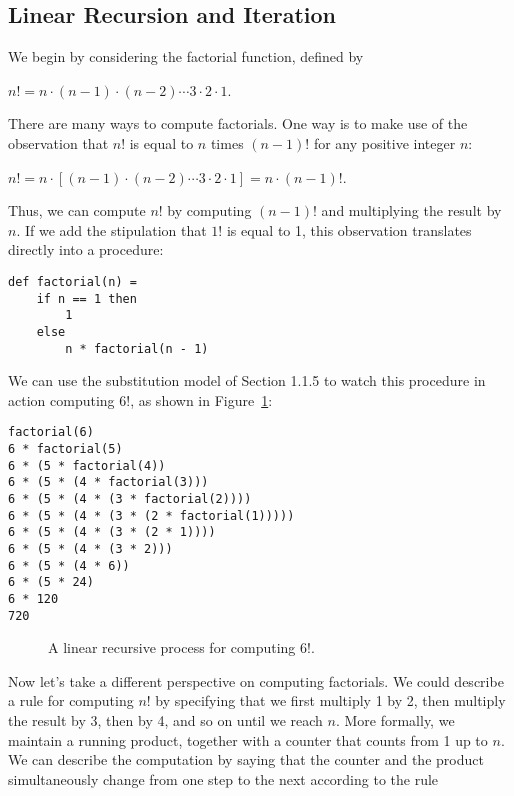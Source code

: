\subsection{Linear Recursion and Iteration}

We begin by considering the factorial function, defined by

$n! = n \cdot (n - 1) \cdot (n - 2) \cdots 3 \cdot 2 \cdot 1$.

There are many ways to compute factorials. One way is to make use of the observation that $n!$ is equal to $n$ times $(n - 1)!$ for any positive integer $n$:

$n! = n \cdot [(n - 1) \cdot (n - 2) \cdots 3 \cdot 2 \cdot 1] = n \cdot (n - 1)!$.

Thus, we can compute $n!$ by computing $(n - 1)!$ and multiplying the result by $n$. If we add the stipulation that $1!$ is equal to 1, this observation translates directly into a procedure:

\begin{lstlisting}
def factorial(n) =
    if n == 1 then
        1
    else
        n * factorial(n - 1)
\end{lstlisting}

We can use the substitution model of Section 1.1.5 to watch this procedure in action computing $6!$, as shown in Figure~\ref{fig:linear-recursive-factorial}:

\begin{verbatim}
factorial(6)
6 * factorial(5)
6 * (5 * factorial(4))
6 * (5 * (4 * factorial(3)))
6 * (5 * (4 * (3 * factorial(2))))
6 * (5 * (4 * (3 * (2 * factorial(1)))))
6 * (5 * (4 * (3 * (2 * 1))))
6 * (5 * (4 * (3 * 2)))
6 * (5 * (4 * 6))
6 * (5 * 24)
6 * 120
720
\end{verbatim}

\begin{figure}[h]
\centering
\caption{A linear recursive process for computing $6!$.}
\label{fig:linear-recursive-factorial}
\end{figure}

Now let's take a different perspective on computing factorials. We could describe a rule for computing $n!$ by specifying that we first multiply 1 by 2, then multiply the result by 3, then by 4, and so on until we reach $n$. More formally, we maintain a running product, together with a counter that counts from 1 up to $n$. We can describe the computation by saying that the counter and the product simultaneously change from one step to the next according to the rule

